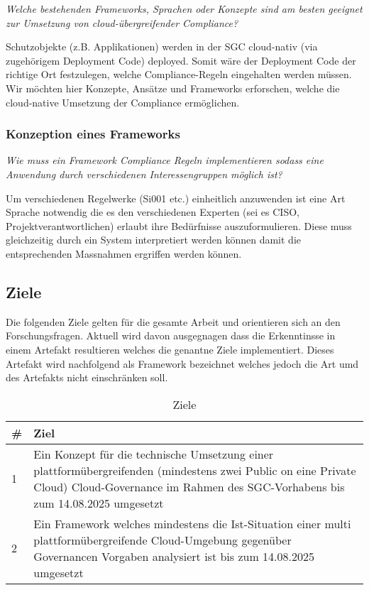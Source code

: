 \textit{Welche bestehenden Frameworks, Sprachen oder Konzepte sind am besten geeignet zur Umsetzung von cloud-übergreifender Compliance?}

Schutzobjekte (z.B. Applikationen) werden in der SGC cloud-nativ (via zugehörigem Deployment Code) deployed. Somit wäre der Deployment Code der richtige Ort festzulegen, welche Compliance-Regeln eingehalten werden müssen. Wir möchten hier Konzepte, Ansätze und Frameworks erforschen, welche die cloud-native Umsetzung der Compliance ermöglichen.


\subsubsection{Konzeption eines Frameworks}

\textit{Wie muss ein Framework Compliance Regeln implementieren sodass eine Anwendung durch verschiedenen Interessengruppen möglich ist?}

Um verschiedenen Regelwerke (Si001 etc.) einheitlich anzuwenden ist eine Art Sprache notwendig die es den verschiedenen Experten (sei es CISO, Projektverantwortlichen) erlaubt ihre Bedürfnisse auszuformulieren. Diese muss gleichzeitig durch ein System interpretiert werden können damit die entsprechenden Massnahmen ergriffen werden können.

\subsection{Ziele}
Die folgenden Ziele gelten für die gesamte Arbeit und orientieren sich an den Forschungsfragen. Aktuell wird davon ausgegnagen dass die Erkenntinsse in einem Artefakt resultieren welches die genantne Ziele implementiert. Dieses Artefakt wird nachfolgend als Framework bezeichnet welches jedoch die Art umd des Artefakts nicht einschränken soll.

\begin{table}[H]
    \centering
    \begin{tabularx}{\textwidth}{|l|X|}
        \hline
        \textbf{\#} & \textbf{Ziel} \\
        \hline
        1 & Ein Konzept für die technische Umsetzung einer plattformübergreifenden (mindestens zwei Public on eine Private Cloud) Cloud-Governance im Rahmen des SGC-Vorhabens bis zum 14.08.2025 umgesetzt \\
        \hline
        2 & Ein Framework welches mindestens die Ist-Situation einer multi plattformübergreifende Cloud-Umgebung gegenüber Governancen Vorgaben analysiert ist bis zum 14.08.2025 umgesetzt  \\
        \hline
    \end{tabularx}
    \caption{Ziele}
    \label{tab:goals}
\end{table}

